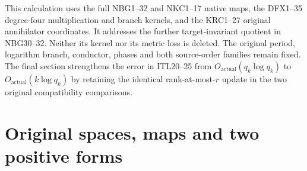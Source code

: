 \documentclass[11pt,a4paper]{article}
\begin{document}

\clearpage
\begingroup
\providecommand{\im}{}
\renewcommand{\im}{\operatorname{im}}
\providecommand{\diag}{}
\renewcommand{\diag}{\operatorname{diag}}
\providecommand{\rank}{}
\renewcommand{\rank}{\operatorname{rank}}


This calculation uses the full NBG1--32 and NKC1--17 native maps,
the DFX1--35 degree-four multiplication and branch kernels, and the
KRC1--27 original annihilator coordinates. It addresses the further
target-invariant quotient in NBG30--32. Neither its kernel nor its
metric loss is deleted. The original period, logarithm branch,
conductor, phases and both source-order families remain fixed.
The final section strengthens the error in ITL20--25 from
$O_{\mathrm{actual}}(q_k\log q_k)$ to
$O_{\mathrm{actual}}(k\log q_k)$ by retaining the identical
rank-at-most-$r$ update in the two original compatibility comparisons.

\section{Original spaces, maps and two positive forms}
\end{document}
